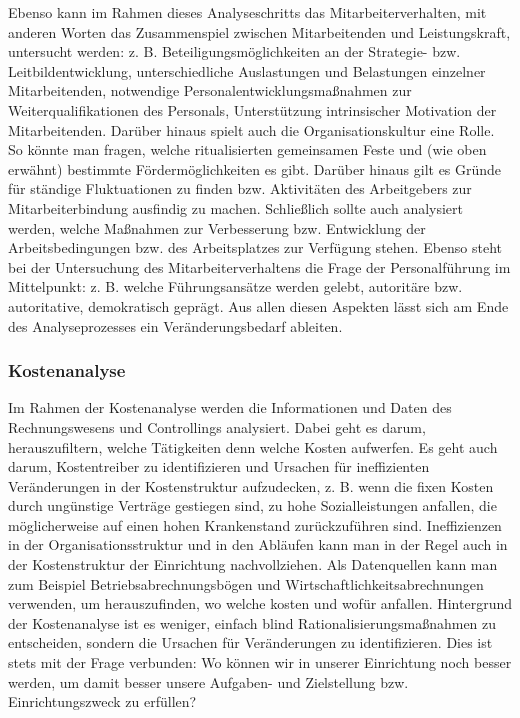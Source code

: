 \documentclass[
  letterpaper,
]{book}
\begin{document}
Ebenso kann im Rahmen dieses Analyseschritts das Mitarbeiterverhalten,
mit anderen Worten das Zusammenspiel zwischen Mitarbeitenden und
Leistungskraft, untersucht werden: z. B. Beteiligungsmöglichkeiten an
der Strategie- bzw. Leitbildentwicklung, unterschiedliche Auslastungen
und Belastungen einzelner Mitarbeitenden, notwendige
Personalentwicklungsmaßnahmen zur Weiterqualifikationen des Personals,
Unterstützung intrinsischer Motivation der Mitarbeitenden. Darüber
hinaus spielt auch die Organisationskultur eine Rolle. So könnte man
fragen, welche ritualisierten gemeinsamen Feste und (wie oben erwähnt)
bestimmte Fördermöglichkeiten es gibt. Darüber hinaus gilt es Gründe für
ständige Fluktuationen zu finden bzw. Aktivitäten des Arbeitgebers zur
Mitarbeiterbindung ausfindig zu machen. Schließlich sollte auch
analysiert werden, welche Maßnahmen zur Verbesserung bzw. Entwicklung
der Arbeitsbedingungen bzw. des Arbeitsplatzes zur Verfügung stehen.
Ebenso steht bei der Untersuchung des Mitarbeiterverhaltens die Frage
der Personalführung im Mittelpunkt: z. B. welche Führungsansätze werden
gelebt, autoritäre bzw. autoritative, demokratisch geprägt. Aus allen
diesen Aspekten lässt sich am Ende des Analyseprozesses ein
Veränderungsbedarf ableiten.

\subsubsection{Kostenanalyse}\label{kostenanalyse}

Im Rahmen der Kostenanalyse werden die Informationen und Daten des
Rechnungswesens und Controllings analysiert. Dabei geht es darum,
herauszufiltern, welche Tätigkeiten denn welche Kosten aufwerfen. Es
geht auch darum, Kostentreiber zu identifizieren und Ursachen für
ineffizienten Veränderungen in der Kostenstruktur aufzudecken, z. B.
wenn die fixen Kosten durch ungünstige Verträge gestiegen sind, zu hohe
Sozialleistungen anfallen, die möglicherweise auf einen hohen
Krankenstand zurückzuführen sind. Ineffizienzen in der
Organisationsstruktur und in den Abläufen kann man in der Regel auch in
der Kostenstruktur der Einrichtung nachvollziehen. Als Datenquellen kann
man zum Beispiel Betriebsabrechnungsbögen und
Wirtschaftlichkeitsabrechnungen verwenden, um herauszufinden, wo welche
kosten und wofür anfallen. Hintergrund der Kostenanalyse ist es weniger,
einfach blind Rationalisierungsmaßnahmen zu entscheiden, sondern die
Ursachen für Veränderungen zu identifizieren. Dies ist stets mit der
Frage verbunden: Wo können wir in unserer Einrichtung noch besser
werden, um damit besser unsere Aufgaben- und Zielstellung bzw.
Einrichtungszweck zu erfüllen?
\end{document}
